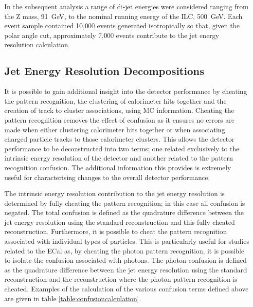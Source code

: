 In the subsequent analysis a range of di-jet energies were considered ranging from the Z mass, 91~GeV, to the nominal running energy of the ILC, 500~GeV.  Each event sample contained 10,000 events generated isotropically so that, given the polar angle cut, approximately 7,000 events contribute to the jet energy resolution calculation. 


\subsection{Jet Energy Resolution Decompositions}
It is possible to gain additional insight into the detector performance by cheating the pattern recognition, the clustering of calorimeter hits together and the creation of track to cluster associations, using MC information.  Cheating the pattern recognition removes the effect of confusion as it ensures no errors are made when either clustering calorimeter hits together or when associating charged particle tracks to those calorimeter clusters.  This allows the detector performance to be deconstructed into two terms; one related exclusively to the intrinsic energy resolution of the detector and another related to the pattern recognition confusion.  The additional information this provides is extremely useful for characterising changes to the overall detector performance.  

The intrinsic energy resolution contribution to the jet energy resolution is determined by fully cheating the pattern recognition; in this case all confusion is negated.  The total confusion is defined as the quadrature difference between the jet energy resolution using the standard reconstruction and this fully cheated reconstruction.  Furthermore, it is possible to cheat the pattern recognition associated with individual types of particles.  This is particularly useful for studies related to the ECal as, by cheating the photon pattern recognition, it is possible to isolate the confusion associated with photons.  The photon confusion is defined as the quadrature difference between the jet energy resolution using the standard reconstruction and the reconstruction where the photon pattern recognition is cheated.  Examples of the calculation of the various confusion terms defined above are given in table \ref{table:confusioncalculation}.

